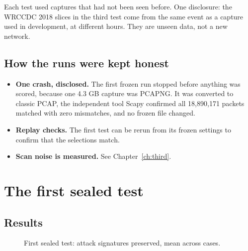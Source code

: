 Each test used captures that had not been seen before. One disclosure: the WRCCDC 2018 slices in the third test come from the same event as a capture used in development, at different hours. They are unseen data, not a new network.

\section{How the runs were kept honest}
\begin{itemize}
\item \textbf{One crash, disclosed.} The first frozen run stopped before anything was scored, because one 4.3 GB capture was PCAPNG. It was converted to classic PCAP, the independent tool Scapy confirmed all 18,890,171 packets matched with zero mismatches, and no frozen file changed.
\item \textbf{Replay checks.} The first test can be rerun from its frozen settings to confirm that the selections match.
\item \textbf{Scan noise is measured.} See Chapter~\ref{ch:third}.
\end{itemize}

\chapter{The first sealed test}
\label{ch:first}

\section{Results}
\begin{figure}[H]
\centering
{}
\caption{First sealed test: attack signatures preserved, mean across cases.}
\end{figure}


